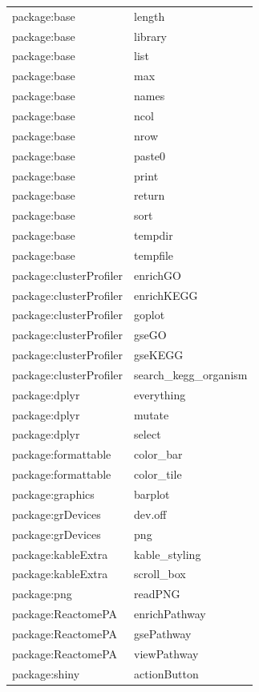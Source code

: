 \documentclass[]{article}
\begin{document}
\begin{longtable}{ll}
\rowcolor{gray!6} package:base & length\\
package:base & library\\
\rowcolor{gray!6} package:base & list\\
package:base & max\\
\rowcolor{gray!6} package:base & names\\
package:base & ncol\\
\rowcolor{gray!6} package:base & nrow\\
package:base & paste0\\
\rowcolor{gray!6} package:base & print\\
package:base & return\\
\rowcolor{gray!6} package:base & sort\\
package:base & tempdir\\
\rowcolor{gray!6} package:base & tempfile\\
package:clusterProfiler & enrichGO\\
\rowcolor{gray!6} package:clusterProfiler & enrichKEGG\\
package:clusterProfiler & goplot\\
\rowcolor{gray!6} package:clusterProfiler & gseGO\\
package:clusterProfiler & gseKEGG\\
\rowcolor{gray!6} package:clusterProfiler & search\_kegg\_organism\\
package:dplyr & everything\\
\rowcolor{gray!6} package:dplyr & mutate\\
package:dplyr & select\\
\rowcolor{gray!6} package:formattable & color\_bar\\
package:formattable & color\_tile\\
\rowcolor{gray!6} package:graphics & barplot\\
package:grDevices & dev.off\\
\rowcolor{gray!6} package:grDevices & png\\
package:kableExtra & kable\_styling\\
\rowcolor{gray!6} package:kableExtra & scroll\_box\\
package:png & readPNG\\
\rowcolor{gray!6} package:ReactomePA & enrichPathway\\
package:ReactomePA & gsePathway\\
\rowcolor{gray!6} package:ReactomePA & viewPathway\\
package:shiny & actionButton\\

\end{longtable}
\end{document}
